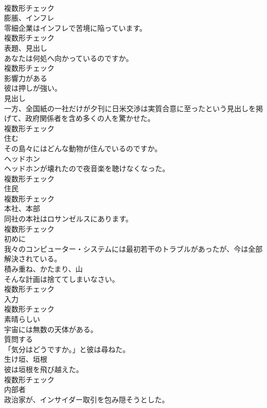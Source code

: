\documentclass[8pt]{extreport}
\begin{document}
\begin{CJK}{UTF8}{min}
\\	複数形チェック
\\	[名詞]	膨脹、インフレ	
\\	零細企業はインフレで苦境に陥っています。	
\\	複数形チェック
\\	[名詞]	表題、見出し	
\\	あなたは何処へ向かっているのですか。	
\\	複数形チェック
\\	[形容詞]	影響力がある	
\\	彼は押しが強い。	
\\	[名詞]	見出し	
\\	一方、全国紙の一社だけが夕刊に日米交渉は実質合意に至ったという見出しを掲げて、政府関係者を含め多くの人を驚かせた。	
\\	複数形チェック
\\	[動詞]	住む	
\\	その島々にはどんな動物が住んでいるのですか。	
\\	[名詞]	ヘッドホン	
\\	ヘッドホンが壊れたので夜音楽を聴けなくなった。	
\\	複数形チェック
\\	[名詞]	住⺠	
\\	複数形チェック
\\	[名詞]	本社、本部	
\\	同社の本社はロサンゼルスにあります。	
\\	複数形チェック
\\	[副詞]	初めに	
\\	我々のコンピューター・システムには最初若干のトラブルがあったが、今は全部解決されている。	
\\	[名詞]	積み重ね、かたまり、山	
\\	そんな計画は捨ててしまいなさい。	
\\	複数形チェック
\\	[名詞]	入力	
\\	複数形チェック
\\	[形容詞]	素晴らしい	
\\	宇宙には無数の天体がある。	
\\	[動詞]	質問する	
\\	「気分はどうですか。」と彼は尋ねた。	
\\	[名詞]	生け垣、垣根	
\\	彼は垣根を飛び越えた。	
\\	複数形チェック
\\	[名詞]	内部者	
\\	政治家が、インサイダー取引を包み隠そうとした。	

\end{CJK}
\end{document}
